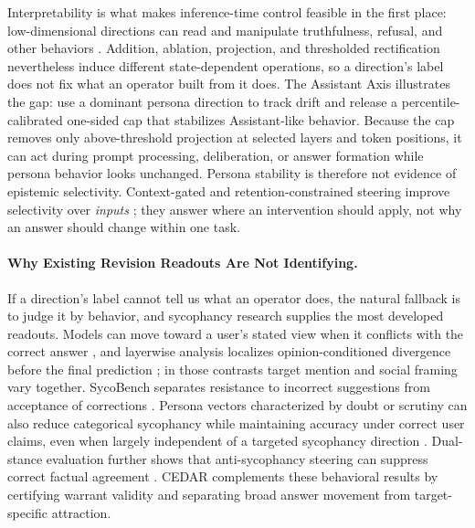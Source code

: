 \documentclass[letterpaper]{article} %
\begin{document}
Interpretability is what makes inference-time control feasible in the first place: low-dimensional directions can read and manipulate truthfulness, refusal, and other behaviors \citep{zou2023representation,turner2023steering,li2023inference,rimsky2024steering,arditi2024refusal}. Addition, ablation, projection, and thresholded rectification nevertheless induce different state-dependent operations, so a direction's label does not fix what an operator built from it does. The Assistant Axis illustrates the gap: \citet{lu2026assistant} use a dominant persona direction to track drift and release a percentile-calibrated one-sided cap that stabilizes Assistant-like behavior. Because the cap removes only above-threshold projection at selected layers and token positions, it can act during prompt processing, deliberation, or answer formation while persona behavior looks unchanged. Persona stability is therefore not evidence of epistemic selectivity. Context-gated and retention-constrained steering improve selectivity over \emph{inputs} \citep{lee2025programming,stickland2024steering}; they answer where an intervention should apply, not why an answer should change within one task.

\paragraph{Why Existing Revision Readouts Are Not Identifying.}

If a direction's label cannot tell us what an operator does, the natural fallback is to judge it by behavior, and sycophancy research supplies the most developed readouts. Models can move toward a user's stated view when it conflicts with the correct answer \citep{sharma2024towards}, and layerwise analysis localizes opinion-conditioned divergence before the final prediction \citep{wang2026truth}; in those contrasts target mention and social framing vary together. SycoBench separates resistance to incorrect suggestions from acceptance of corrections \citep{sinha2026sycobench}. Persona vectors characterized by doubt or scrutiny can also reduce categorical sycophancy while maintaining accuracy under correct user claims, even when largely independent of a targeted sycophancy direction \citep{kelkar2026devil}. Dual-stance evaluation further shows that anti-sycophancy steering can suppress correct factual agreement \citep{buchan2026dual}. CEDAR complements these behavioral results by certifying warrant validity and separating broad answer movement from target-specific attraction.
\end{document}
